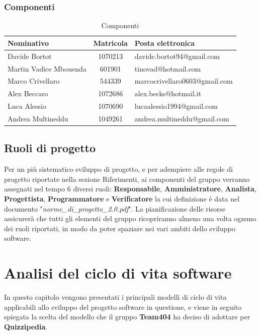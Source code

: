 \documentclass[a4paper,11pt]{article}
\begin{document}
	\subsubsection*{Componenti}
			\begin{table}[h!]			
				\begin{center}
				\begin{tabular}{l c l}
				\textbf{Nominativo} & \textbf{Matricola} & \textbf{Posta elettronica}\\
				\midrule
				Davide Bortot & 1070213 & davide.bortot94@gmail.com \\
				Martin Vadice Mbouenda & 601901 & tinovad@hotmail.com \\
				Marco Crivellaro & 544339 & marcocrivellaro0603@gmail.com \\
				Alex Beccaro & 1072686 & alex.becks@hotmail.it \\
				Luca Alessio & 1070690 & lucaalessio1994@gmail.com \\
				Andrea Multineddu & 1049261 & andrea.multineddu@gmail.com \\
				\midrule
				\end{tabular}
			\end{center}
			\caption{Componenti}
			\end{table}	

	\subsection{Ruoli di progetto}
		Per un più sistematico sviluppo di progetto, e per adempiere alle regole di progetto riportate nella sezione Riferimenti, ai componenti del gruppo verranno assegnati nel tempo 6 diversi ruoli: \textbf{Responsabile}, \textbf{Amministratore}, \textbf{Analista}, \textbf{Progettista}, \textbf{Programmatore} e \textbf{Verificatore} la cui definizione è data nel documento "\textit{norme\_di\_progetto\_2.0.pdf}". La pianificazione delle risorse assicurerà che tutti gli elementi del gruppo ricopriranno almeno una volta ognuno dei ruoli riportati, in modo da poter spaziare nei vari ambiti dello sviluppo software.
		
	\pagebreak	
	
	\newpage
	\section{Analisi del ciclo di vita software}	
	In questo capitolo vengono presentati i principali modelli di ciclo di vita applicabili allo sviluppo del progetto software in questione, e viene in seguito spiegata la scelta del modello che il gruppo \textbf{Team404} ha deciso di adottare per \textbf{Quizzipedia}.
\end{document}
